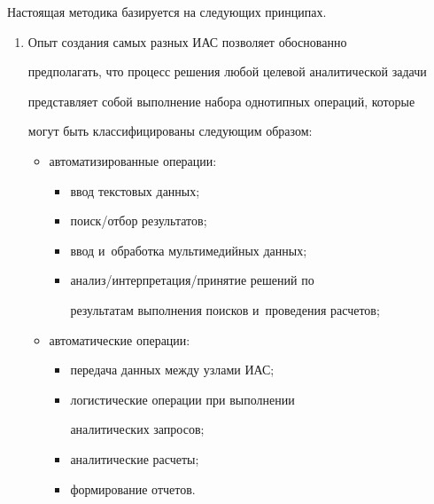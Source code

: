      Настоящая методика базируется на следующих принципах.


      \begin{enumerate}[1.]


\item  Опыт создания самых разных ИАС позволяет обоснованно 


предполагать, что процесс решения любой целевой аналитической задачи 


представляет собой выполнение набора однотипных операций, которые 


могут быть классифицированы следующим образом:


\begin{itemize}


\item автоматизированные операции:


\begin{itemize}


\item ввод текстовых данных;


\item поиск\!/\!отбор результатов;


\item ввод и~обработка мультимедийных данных;


\item анализ\!/\!интерпретация\!/\!принятие решений по 


результатам выполнения поисков и~проведения расчетов;


\end{itemize}


\item автоматические операции:


\begin{itemize}


\item передача данных между узлами ИАС;


\item логистические операции при выполнении 


аналитических запросов;


\item аналитические расчеты;


\item формирование отчетов.


\end{itemize}


\end{itemize}



\end{enumerate}
